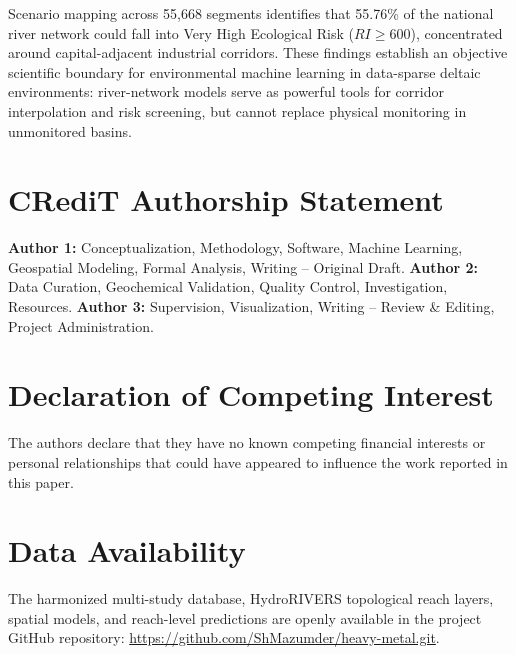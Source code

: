 \documentclass[authoryear,preprint,12pt]{elsarticle}
\begin{document}
Scenario mapping across 55,668 segments identifies that 55.76\% of the national river network could fall into Very High Ecological Risk ($RI \ge 600$), concentrated around capital-adjacent industrial corridors. These findings establish an objective scientific boundary for environmental machine learning in data-sparse deltaic environments: river-network models serve as powerful tools for corridor interpolation and risk screening, but cannot replace physical monitoring in unmonitored basins.

\section*{CRediT Authorship Statement}
\textbf{Author 1:} Conceptualization, Methodology, Software, Machine Learning, Geospatial Modeling, Formal Analysis, Writing -- Original Draft.
\textbf{Author 2:} Data Curation, Geochemical Validation, Quality Control, Investigation, Resources.
\textbf{Author 3:} Supervision, Visualization, Writing -- Review \& Editing, Project Administration.

\section*{Declaration of Competing Interest}
The authors declare that they have no known competing financial interests or personal relationships that could have appeared to influence the work reported in this paper.

\section*{Data Availability}
The harmonized multi-study database, HydroRIVERS topological reach layers, spatial models, and reach-level predictions are openly available in the project GitHub repository: \url{https://github.com/ShMazumder/heavy-metal.git}.



\end{document}
